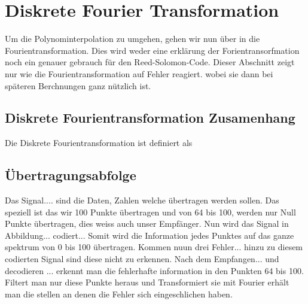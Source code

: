 %
%
%
\section{Diskrete Fourier Transformation
\label{reedsolomon:section:dtf}}
Um die Polynominterpolation zu umgehen, gehen wir nun über in die Fourientransformation.
Dies wird weder eine erklärung der Forientransorfmation noch ein genauer gebrauch
für den Reed-Solomon-Code. Dieser Abschnitt zeigt nur wie die Fourientransformation auf Fehler reagiert.
wobei sie dann bei späteren Berchnungen ganz nützlich ist.

\subsection{Diskrete Fourientransformation Zusamenhang
\label{reedsolomon:subsection:dtfzusamenhang}}
Die Diskrete Fourientransformation ist definiert als

\subsection{Übertragungsabfolge
\label{reedsolomon:subsection:Übertragungsabfolge}}
Das Signal.... sind die Daten, Zahlen welche übertragen werden sollen.
Das speziell ist das wir 100 Punkte übertragen und von 64 bis 100,
werden nur Null Punkte übertragen, dies weiss auch unser Empfänger.
Nun wird das Signal in Abbildung... codiert...
Somit wird die Information jedes Punktes auf das ganze spektrum von 0 bis 100 übertragen.
Kommen nuun drei Fehler... hinzu zu diesem codierten Signal sind diese nicht zu erkennen.
Nach dem Empfangen... und decodieren ... erkennt man die fehlerhafte information in den Punkten 64 bis 100.
Filtert man nur diese Punkte heraus und Transformiert sie mit Fourier erhält man die stellen an denen die Fehler sich eingeschlichen haben.





